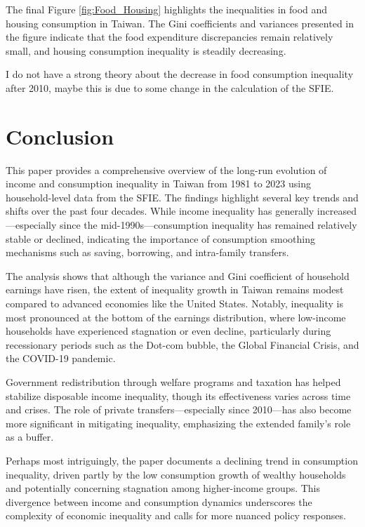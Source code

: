 \documentclass{article}
\begin{document}
The final Figure \ref{fig:Food_Housing} highlights the inequalities in food and housing consumption in Taiwan. The Gini coefficients and variances presented in the figure indicate that the food expenditure discrepancies remain relatively small, and housing consumption inequality is steadily decreasing.

I do not have a strong theory about the decrease in food consumption inequality after 2010, maybe this is due to some change in the calculation of the SFIE.


\section{Conclusion}
\label{sec:conclusion}

This paper provides a comprehensive overview of the long-run evolution of income and consumption inequality in Taiwan from 1981 to 2023 using household-level data from the SFIE. The findings highlight several key trends and shifts over the past four decades. While income inequality has generally increased—especially since the mid-1990s—consumption inequality has remained relatively stable or declined, indicating the importance of consumption smoothing mechanisms such as saving, borrowing, and intra-family transfers.

The analysis shows that although the variance and Gini coefficient of household earnings have risen, the extent of inequality growth in Taiwan remains modest compared to advanced economies like the United States. Notably, inequality is most pronounced at the bottom of the earnings distribution, where low-income households have experienced stagnation or even decline, particularly during recessionary periods such as the Dot-com bubble, the Global Financial Crisis, and the COVID-19 pandemic.

Government redistribution through welfare programs and taxation has helped stabilize disposable income inequality, though its effectiveness varies across time and crises. The role of private transfers—especially since 2010—has also become more significant in mitigating inequality, emphasizing the extended family's role as a buffer.

Perhaps most intriguingly, the paper documents a declining trend in consumption inequality, driven partly by the low consumption growth of wealthy households and potentially concerning stagnation among higher-income groups. This divergence between income and consumption dynamics underscores the complexity of economic inequality and calls for more nuanced policy responses.
\end{document}
